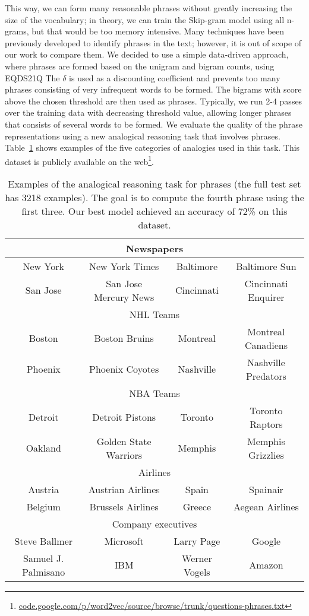 \documentclass{article}
\begin{document}
This way, we can form many reasonable phrases without greatly increasing the size
of the vocabulary; in theory, we can train the Skip-gram model
using all n-grams, but that would
be too memory intensive. Many techniques have been previously developed
to identify phrases in the text;
however, it is out of scope of our work to compare them. We decided to use
a simple data-driven approach, where phrases are formed
based on the unigram and bigram counts, using
EQDS21Q
The $\delta$ is used as a discounting coefficient and prevents too many
phrases consisting of very infrequent words to be formed.
The bigrams with score above the chosen threshold are then used as phrases.
Typically, we run 2-4 passes over the training data with decreasing
threshold value, allowing longer phrases that consists of several words to be formed.
We evaluate the quality of the phrase representations using a new analogical
reasoning task that involves phrases. Table~\ref{table:phrase_example} shows
examples of the five categories of analogies used in this task. This dataset is publicly available
on the web\footnote{\url{code.google.com/p/word2vec/source/browse/trunk/questions-phrases.txt}}.

\begin{table}
\small
\begin{center}
\begin{tabular}{|c c||c c|}
\hline
\multicolumn{4}{|c|}{Newspapers}\\
\hline
New York & New York Times & Baltimore & Baltimore Sun \\
San Jose & San Jose Mercury News & Cincinnati & Cincinnati Enquirer \\
\hline
\multicolumn{4}{|c|}{NHL Teams}\\
\hline
Boston & Boston Bruins & Montreal & Montreal Canadiens \\
Phoenix & Phoenix Coyotes & Nashville & Nashville Predators \\
\hline
\multicolumn{4}{|c|}{NBA Teams}\\
\hline
Detroit & Detroit Pistons & Toronto & Toronto Raptors \\
Oakland & Golden State Warriors & Memphis & Memphis Grizzlies \\
\hline
\multicolumn{4}{|c|}{Airlines}\\
\hline
Austria & Austrian Airlines & Spain & Spainair \\
Belgium & Brussels Airlines & Greece & Aegean Airlines \\
\hline
\multicolumn{4}{|c|}{Company executives}\\
\hline
Steve Ballmer & Microsoft & Larry Page & Google \\
Samuel J. Palmisano & IBM & Werner Vogels & Amazon \\
\hline
\end{tabular}
\end{center}
\caption{
\label{table:phrase_example} Examples of the
analogical reasoning task for phrases (the full test set has 3218 examples).
The goal is to compute the fourth phrase using the first three. Our best model achieved an accuracy of 72\% on this dataset.}
\end{table}
\end{document}

